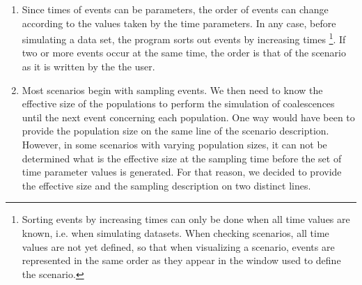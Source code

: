 \begin{enumerate}
merged with population 1, does not "exist" anymore (the surviving population is population 1). So, it cannot
receive lineages of population 3 as it should as a result of the
second line. The correct ways are either to put line 2 before line
1, or to change line 2 to :\\ \texttt{100 merge 1 3}.
\item Since times of events can be parameters, the order of events
can change according to the values taken by the time parameters. In
any case, before simulating a data set, the program sorts out events
by increasing times \footnote{ Sorting events by increasing times can only be done when all time values are known, i.e. when simulating datasets. When checking scenarios, all time values are not yet defined, so that when visualizing a scenario, events are represented in the same order as they appear in the window used to define the scenario.}. If two or more events occur at the same time,
the order is that of the scenario as it is written by the the user.
\item Most scenarios begin with sampling events. We then need to
know the effective size of the populations to perform the simulation
of coalescences until the next event concerning each population. One
way would have been to provide the population size on the same line
of the scenario description. However, in some scenarios with varying
population sizes, it can not be determined what is the effective
size at the sampling time before the set of time parameter values is
generated. For that reason, we decided to provide the effective size
and the sampling description on two distinct lines.
\end{enumerate}

